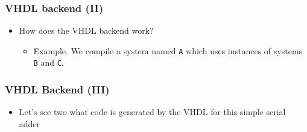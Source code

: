 \documentclass{beamer}
\begin{document}
\beamerdefaultoverlayspecification{}
\begin{frame}
  \frametitle{VHDL backend (II)}
\vspace{-0.2cm}
\begin{itemize}
\item How does the VHDL backend work?
  \begin{itemize}
  \item Example. We compile a system named \texttt{A} which uses instances 
    of systems \texttt{B} and \texttt{C}.
  \end{itemize}
\vspace{0.1cm}
\begin{center}
\end{center}
\end{itemize}
\end{frame}


\begin{frame}
  \frametitle{VHDL Backend (III)}
  \begin{itemize}
  \item Let's see two what code is generated by the VHDL for this simple
    serial adder
    \begin{center}
    \end{center}
  \end{itemize}
\end{frame}

\beamerdefaultoverlayspecification{<+->}
\end{document}
